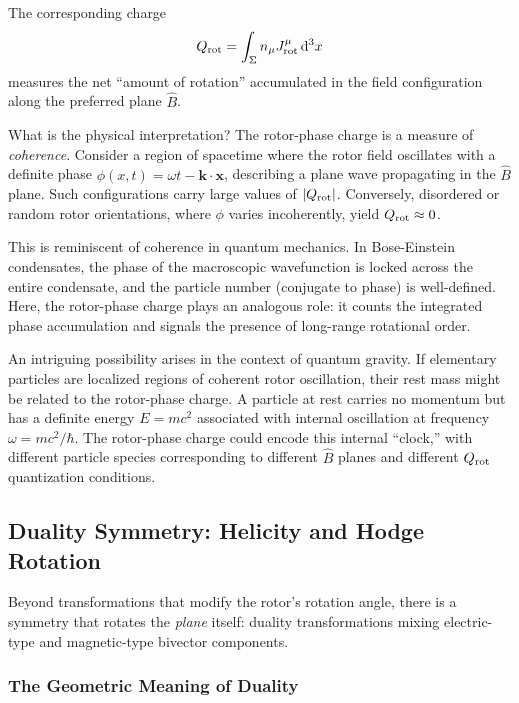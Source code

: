 \documentclass[11pt,a4paper]{article}
\numberwithin{equation}{section}
\theoremstyle{plain}
\theoremstyle{definition}
\theoremstyle{remark}
\newcommand{\dd}{\mathrm{d}}
\begin{document}
The corresponding charge
\begin{equation}
Q_{\rm rot} = \int_\Sigma n_\mu J^\mu_{\rm rot}\, \dd^3x
\end{equation}
measures the net ``amount of rotation'' accumulated in the field configuration along the preferred plane $\hat{B}$.

What is the physical interpretation? The rotor-phase charge is a measure of \emph{coherence}. Consider a region of spacetime where the rotor field oscillates with a definite phase $\phi(x,t) = \omega t - \mathbf{k}\cdot\mathbf{x}$, describing a plane wave propagating in the $\hat{B}$ plane. Such configurations carry large values of $|Q_{\rm rot}|$. Conversely, disordered or random rotor orientations, where $\phi$ varies incoherently, yield $Q_{\rm rot} \approx 0$.

This is reminiscent of coherence in quantum mechanics. In Bose-Einstein condensates, the phase of the macroscopic wavefunction is locked across the entire condensate, and the particle number (conjugate to phase) is well-defined. Here, the rotor-phase charge plays an analogous role: it counts the integrated phase accumulation and signals the presence of long-range rotational order.

An intriguing possibility arises in the context of quantum gravity. If elementary particles are localized regions of coherent rotor oscillation, their rest mass might be related to the rotor-phase charge. A particle at rest carries no momentum but has a definite energy $E=mc^2$ associated with internal oscillation at frequency $\omega = mc^2/\hbar$. The rotor-phase charge could encode this internal ``clock,'' with different particle species corresponding to different $\hat{B}$ planes and different $Q_{\rm rot}$ quantization conditions.

\subsection{Duality Symmetry: Helicity and Hodge Rotation}

Beyond transformations that modify the rotor's rotation angle, there is a symmetry that rotates the \emph{plane} itself: duality transformations mixing electric-type and magnetic-type bivector components.

\subsubsection{The Geometric Meaning of Duality}
\end{document}
